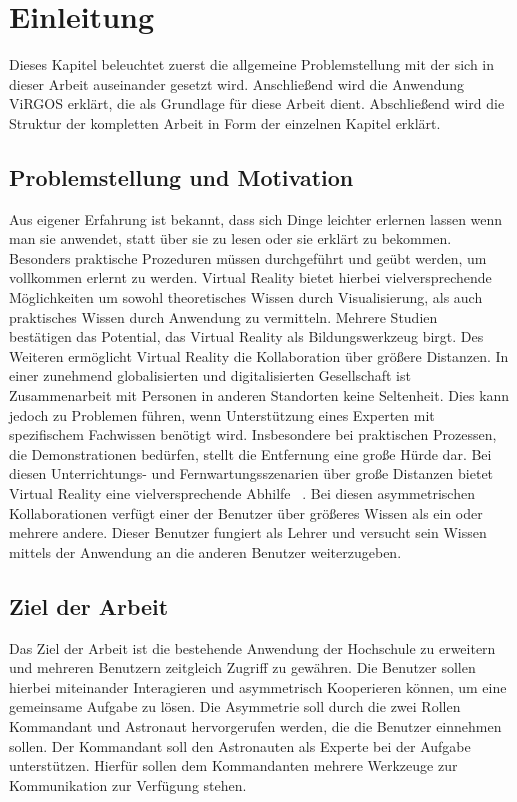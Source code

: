 \section{Einleitung}
Dieses Kapitel beleuchtet zuerst die allgemeine Problemstellung mit der sich in dieser Arbeit auseinander gesetzt wird. Anschließend wird die Anwendung ViRGOS erklärt, die als Grundlage für diese Arbeit dient. Abschließend wird die Struktur der kompletten Arbeit in Form der einzelnen Kapitel erklärt.

\subsection{Problemstellung und Motivation} \label{Problemstellung}
Aus eigener Erfahrung  ist bekannt, dass sich Dinge leichter erlernen lassen wenn man sie anwendet, statt über sie zu lesen oder sie erklärt zu bekommen. Besonders praktische Prozeduren müssen durchgeführt und geübt werden, um vollkommen erlernt zu werden. Virtual Reality bietet hierbei vielversprechende Möglichkeiten um sowohl theoretisches Wissen durch Visualisierung, als auch praktisches Wissen durch Anwendung zu vermitteln. Mehrere Studien ~\parencite{8864531} ~\parencite{8797755} bestätigen das Potential, das Virtual Reality als Bildungswerkzeug birgt. Des Weiteren ermöglicht Virtual Reality die Kollaboration über größere Distanzen. In einer zunehmend globalisierten und digitalisierten Gesellschaft ist Zusammenarbeit mit Personen in anderen Standorten keine Seltenheit. Dies kann jedoch zu Problemen führen, wenn Unterstützung eines Experten mit spezifischem Fachwissen benötigt wird. Insbesondere bei praktischen Prozessen, die Demonstrationen bedürfen, stellt die Entfernung eine große Hürde dar. Bei diesen Unterrichtungs- und Fernwartungsszenarien über große Distanzen bietet Virtual Reality eine vielversprechende Abhilfe ~\parencite{10.1145/2807442.2807497}. Bei diesen asymmetrischen Kollaborationen verfügt einer der Benutzer über größeres Wissen als ein oder mehrere andere. Dieser Benutzer fungiert als Lehrer und versucht sein Wissen mittels der Anwendung an die anderen Benutzer weiterzugeben. \\
 

\subsection{Ziel der Arbeit}

Das Ziel der Arbeit ist die bestehende Anwendung der Hochschule zu erweitern und mehreren Benutzern zeitgleich Zugriff zu gewähren. Die Benutzer sollen hierbei miteinander Interagieren und asymmetrisch Kooperieren können, um eine gemeinsame Aufgabe zu lösen. Die Asymmetrie soll durch die zwei Rollen Kommandant und Astronaut hervorgerufen werden, die die Benutzer einnehmen sollen. Der Kommandant soll den Astronauten als Experte bei der Aufgabe unterstützen. Hierfür sollen dem Kommandanten mehrere Werkzeuge zur Kommunikation zur Verfügung stehen. \\

